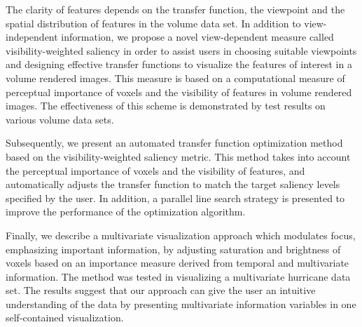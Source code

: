 \documentclass[a4paper, 12pt, oneside]{report}         %
\begin{document}
\begin{thesisabstract}
The clarity of features depends on the transfer function, the viewpoint and the spatial distribution of features in the volume data set.
In addition to view-independent information, %
we propose a novel view-dependent measure called visibility-weighted saliency in order to assist users in choosing suitable viewpoints and designing effective transfer functions to visualize the features of interest in a volume rendered images. This measure is based on a computational measure of perceptual importance of voxels and the visibility of features in volume rendered images. The effectiveness of this scheme is demonstrated by test results on various volume data sets.

Subsequently, we present an automated transfer function optimization method based on the visibility-weighted saliency metric. This method takes into account the perceptual importance of voxels and the visibility of features, and automatically adjusts the transfer function to match the target saliency levels specified by the user. In addition, a parallel line search strategy is presented to improve the performance of the optimization algorithm.

Finally, we describe a multivariate visualization approach which modulates focus, emphasizing important information, by adjusting saturation and brightness of voxels based on an importance measure derived from temporal and multivariate information.
The method was tested in visualizing a multivariate hurricane data set. The results suggest that our approach can give the user an intuitive understanding of the data by presenting multivariate information variables in one self-contained visualization.


\end{thesisabstract}
\end{document}
